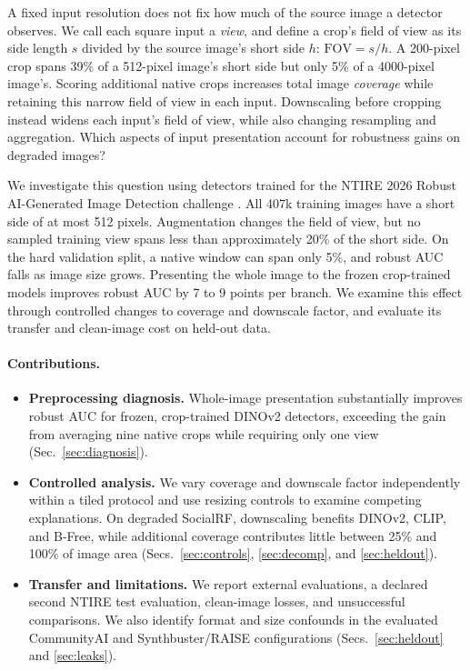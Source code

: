 \documentclass[letterpaper]{article} %
\newcommand{\fov}{\mathrm{FOV}}
\begin{document}
A fixed input resolution does not fix how much of the source image a
detector observes. We call each square input a \emph{view}, and define a
crop's field of view as its side length $s$ divided by the source image's
short side $h$: $\fov = s/h$. A 200-pixel crop spans 39\% of a 512-pixel
image's short side but only 5\% of a 4000-pixel image's. Scoring additional
native crops increases total image \emph{coverage} while retaining this
narrow field of view in each input. Downscaling before cropping instead
widens each input's field of view, while also changing resampling and
aggregation. Which aspects of input presentation account for robustness
gains on degraded images?

We investigate this question using detectors trained for the NTIRE 2026
Robust AI-Generated Image Detection challenge \cite{gushchin2026ntire}.
All 407k training images have a short side of at most 512 pixels.
Augmentation changes the field of view, but no sampled training view spans
less than approximately 20\% of the short side. On the hard validation
split, a native window can span only 5\%, and robust AUC falls as image
size grows. Presenting the whole image to the frozen crop-trained models
improves robust AUC by 7 to 9 points per branch. We examine this effect
through controlled changes to coverage and downscale factor, and evaluate
its transfer and clean-image cost on held-out data.

\paragraph{Contributions.}
\begin{itemize}
\item \textbf{Preprocessing diagnosis.} Whole-image presentation substantially
  improves robust AUC for frozen, crop-trained DINOv2 detectors, exceeding
  the gain from averaging nine native crops while requiring only one view
  (Sec.~\ref{sec:diagnosis}).
\item \textbf{Controlled analysis.} We vary coverage and downscale factor
  independently within a tiled protocol and use resizing controls to
  examine competing explanations. On degraded SocialRF, downscaling
  benefits DINOv2, CLIP, and B-Free, while additional coverage contributes
  little between 25\% and 100\% of image area (Secs.~\ref{sec:controls}, \ref{sec:decomp}, and \ref{sec:heldout}).
\item \textbf{Transfer and limitations.} We report external evaluations, a
  declared second NTIRE test evaluation, clean-image losses, and
  unsuccessful comparisons. We also identify format and size confounds in
  the evaluated CommunityAI and Synthbuster/RAISE configurations
  (Secs.~\ref{sec:heldout} and \ref{sec:leaks}).
\end{itemize}
\end{document}

